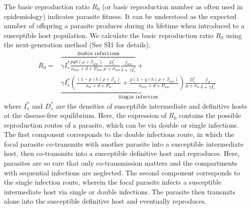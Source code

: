 \documentclass[a4paper]{scrartcl}
\begin{document}
The basic reproduction ratio $R_0$ (or basic reproduction number as often used in epidemiology) indicates parasite fitness. 
It can be understood as the expected number of offspring a parasite produces during its lifetime when introduced to a susceptible host population. 
We calculate the basic reproduction ratio $R_0$ using the next-generation method \citep{Diekmann1990, Diekmann2009, hurford:JRSI:2010} (See SI1 for details).
%
\begin{align}
R_0 = & \overbrace{\gamma I_s^* \frac{p q h (\rho +  \beta_{ww})}{\alpha_{ww} + d + P_{ww}} \frac{D_s^*}{\mu +\sigma_{ww}} \frac{f_{ww}}{\delta +\gamma I_s^*}}^{ \texttt{Double infections}} + \nonumber \\
& \underbrace{\gamma  I_s^* \left( \frac{ (1-p) h (\rho + \beta_w)}{\alpha_w + d + P_w} + \frac{p (1-q) h (\rho + \beta_{ww})}{\alpha_{ww} + d + P_{ww}} \right) \frac{D_s^*}{\mu + \sigma_w} \frac{f_w}{\delta +\gamma  I_s^*}}_{\texttt{Single infection}}
\end{align}
%
where $I_s^*$ and $D_s^*$ are the densities of susceptible intermediate and definitive hosts at the disease-free equilibrium. 
Here, the expression of $R_0$ contains the possible reproduction routes of a parasite, which can be via double or single infections. 
The first component corresponds to the double infections route, in which the focal parasite co-transmits with another parasite into a susceptible intermediate host, then co-transmits into a susceptible definitive host and reproduces. 
Here, parasites are so rare that only co-transmission matters and the compartments with sequential infections are neglected. 
The second component corresponds to the single infection route, wherein the focal parasite infects a susceptible intermediate host via single or double infections. 
The parasite then transmits alone into the susceptible definitive host and eventually reproduces. 
\end{document}
